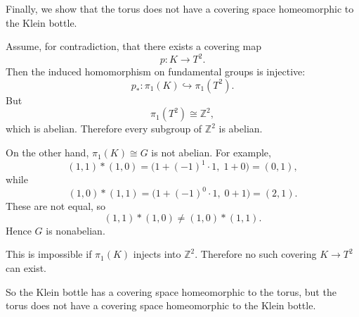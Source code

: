 \documentclass[12pt,a4paper]{article}
\theoremstyle{notespace}
\begin{document}
\medskip

Finally, we show that the torus does not have a covering space homeomorphic to the Klein bottle.

Assume, for contradiction, that there exists a covering map
\[
p:K\to T^2.
\]
Then the induced homomorphism on fundamental groups is injective:
\[
p_*:\pi_1(K)\hookrightarrow \pi_1(T^2).
\]
But
\[
\pi_1(T^2)\cong \mathbb Z^2,
\]
which is abelian. Therefore every subgroup of \(\mathbb Z^2\) is abelian.

On the other hand, \(\pi_1(K)\cong G\) is not abelian. For example,
\[
(1,1)*(1,0)=\bigl(1+(-1)^1\cdot 1,\;1+0\bigr)=(0,1),
\]
while
\[
(1,0)*(1,1)=\bigl(1+(-1)^0\cdot 1,\;0+1\bigr)=(2,1).
\]
These are not equal, so
\[
(1,1)*(1,0)\neq (1,0)*(1,1).
\]
Hence \(G\) is nonabelian.

This is impossible if \(\pi_1(K)\) injects into \(\mathbb Z^2\). Therefore no such covering \(K\to T^2\) can exist.

So the Klein bottle has a covering space homeomorphic to the torus, but the torus does not have a covering space homeomorphic to the Klein bottle.
\end{document}
